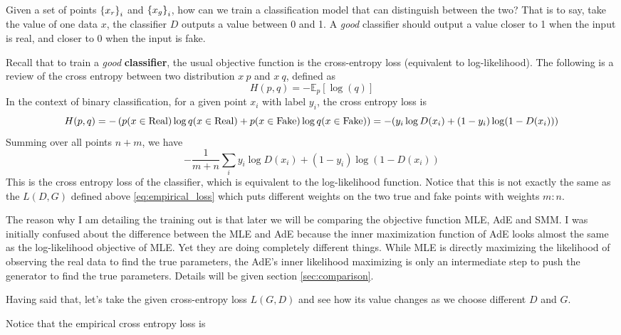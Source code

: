 \documentclass[12pt]{article}
\begin{document}
Given a set of points $\left\{x_r\right\}_i$ and $\left\{x_g\right\}_i$, how can we train a
classification model that can distinguish between the two? That is to say, take
the value of one data $x$, the classifier $D$ outputs a value between 0 and 1.
A \textit{good} classifier should output a value closer to 1 when the input is
real, and closer to 0 when the input is fake.

Recall that to train a \textit{good} \textbf{classifier}, the usual objective
function is the cross-entropy loss (equivalent to log-likelihood). The
following is a review of the cross entropy between two distribution $x~p$ and
$x~q$, defined as
\begin{equation*}
    H(p, q) = -\mathbb{E}_p[\log(q)]
\end{equation*}
In the context of binary classification, for a given point $x_i$ with label $y_i$, the cross entropy loss is
\begin{equation*}
    H(p, q) = - \left( p(x\in \text{Real}) \log q(x\in \text{Real}) + p(x\in \text{Fake})\log q(x\in \text{Fake})\right) = -(y_i \log D(x_i) + (1-y_i) \log (1-D(x_i)))
\end{equation*}
Summing over all points $n+m$, we have
\begin{equation*}
    -\frac{1}{m+n}\sum_i y_i \log D(x_i) + (1-y_i) \log (1-D(x_i))
\end{equation*}
This is the cross entropy loss of the classifier, which is equivalent to the log-likelihood function.
Notice that this is not exactly the same as the $L(D, G)$ defined above \ref{eq:empirical_loss} which puts different weights on the two true and fake points with weights $m:n$.

The reason why I am detailing the training out is that later we will be
comparing the objective function MLE, AdE and SMM. I was initially confused
about the difference between the MLE and AdE because the inner maximization
function of AdE looks almost the same as the log-likelihood objective of MLE.
Yet they are doing completely different things. While MLE is directly
maximizing the likelihood of observing the real data to find the true
parameters, the AdE's inner likelihood maximizing is only an intermediate step
to push the generator to find the true parameters. Details will be given
section \ref{sec:comparison}.

Having said that, let's take the given cross-entropy loss $L(G,D)$ and see how
its value changes as we choose different $D$ and $G$.

Notice that the empirical cross entropy loss is
\end{document}
